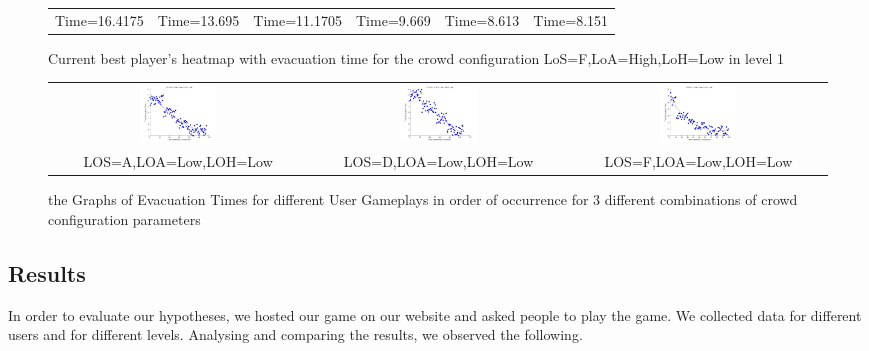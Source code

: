 \begin{figure}[ht]
\begin{tabular}{c c c c c}
	Time=16.4175 & Time=13.695 & Time=11.1705 & Time=9.669 & Time=8.613 & Time=8.151
\end{tabular}
  \caption{\label{fig:codesign-incremental-improvement}Current best player's heatmap with  evacuation time for the crowd configuration LoS=F,LoA=High,LoH=Low in level 1}
  \begin{tabular}{c c c }
	\includegraphics[width=0.31\textwidth]{images/Hypothesis2Graphs/LOS_A_LOA_Low_LOH_Low.jpg} &  \includegraphics[width=0.31\textwidth]{images/Hypothesis2Graphs/LOS_D_LOA_Low_LOH_Low.jpg} &  \includegraphics[width=0.31\textwidth]{images/Hypothesis2Graphs/LOS_F_LOA_Low_LOH_Low.jpg} \\
	LOS=A,LOA=Low,LOH=Low & LOS=D,LOA=Low,LOH=Low & LOS=F,LOA=Low,LOH=Low
\end{tabular}
  \caption{\label{fig:codesign-heatmap-changes}the Graphs of Evacuation Times for different User Gameplays in order of occurrence for 3 different combinations of crowd configuration parameters}
\end{figure}

\subsection{Results}
In order to evaluate our hypotheses, we hosted our game on our website and asked people to play the game. We collected data for different users and for different levels. Analysing and comparing the results, we observed the following.


